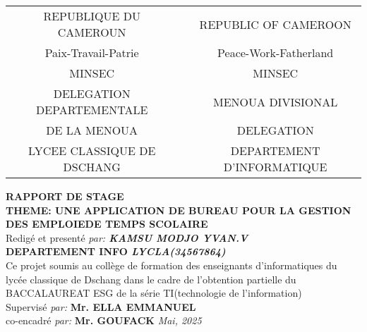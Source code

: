 \documentclass[english,12pt,a4paper]{report}
\begin{document}
\begin{spacing}{1.5}
\begin{titlepage}
\begin{center}
\begin{center}
\begin{tabular}{c c c}
	REPUBLIQUE DU CAMEROUN &             & REPUBLIC OF CAMEROON\\
	Paix-Travail-Patrie &             & Peace-Work-Fatherland\\
	\vspace{1cm} 
	MINSEC &             & MINSEC\\
	DELEGATION DEPARTEMENTALE  &             & MENOUA DIVISIONAL \\
	DE LA MENOUA &             & DELEGATION \\
	LYCEE CLASSIQUE DE DSCHANG &   \hspace{3cm}          & DEPARTEMENT D'INFORMATIQUE
\end{tabular}
\end{center}
\vspace{1.5cm}
{\huge\scshape\textbf{RAPPORT DE STAGE}}\\
\vspace{1.5cm}
{{\Large\scshape\textbf{THEME: UNE APPLICATION DE BUREAU POUR LA GESTION DES EMPLOIEDE TEMPS SCOLAIRE}}\\{\Large Redigé et presenté \emph{par: \textbf{KAMSU MODJO YVAN.V}}\\
\textbf{DEPARTEMENT INFO \emph{LYCLA(34567864)}\\}}}
\vspace{1.2cm}
{\large{Ce projet soumis au collège de formation des enseignants d'informatiques du lycée classique de Dschang dans le cadre de l'obtention partielle du BACCALAUREAT ESG de la série TI(technologie de l'information)}\\}
\vspace{1cm}
{\large Supervisé \emph{par:}
\textbf{Mr. ELLA EMMANUEL}\\
\large co-encadré \emph{par:}
\textbf{Mr. GOUFACK}}
\vfill
{\itshape Mai, 2025}
\end{center}
\end{titlepage}
\cleardoublepage
{}

\end{spacing}
\end{document}
